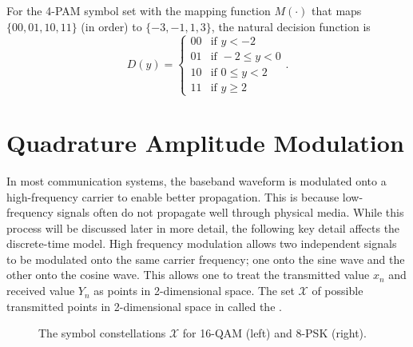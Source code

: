 For the 4-PAM symbol set with the mapping function $M(\cdot)$ that maps $\{00,01,10,11\}$ (in order) to $\{-3,-1,1,3\}$, the natural decision function is
\[ D(y) = \begin{cases}
00 & \text{if }y < -2 \\
01 & \text{if }-2 \leq y<0 \\
10 & \text{if }0 \leq y< 2 \\
11 & \text{if }y \geq 2
\end{cases}. \]

\section{Quadrature Amplitude Modulation}

In most communication systems, the baseband waveform is modulated onto a high-frequency carrier to enable better propagation.
This is because low-frequency signals often do not propagate well through physical media.
While this process will be discussed later in more detail, the following key detail affects the discrete-time model.
High frequency modulation allows two independent signals to be modulated onto the same carrier frequency; one onto the sine wave and the other onto the cosine wave.
This allows one to treat the transmitted value $x_n$ and received value $Y_n$ as points in 2-dimensional space.
The set $\mathcal{X}$ of possible transmitted points in 2-dimensional space in called the .

\begin{figure}
\begin{center}
\scalebox{0.5}
{}
\hspace{5mm}
\scalebox{0.5}
{}
\end{center}
\caption{The symbol constellations $\mathcal{X}$ for 16-QAM (left) and 8-PSK (right).}
\end{figure}

